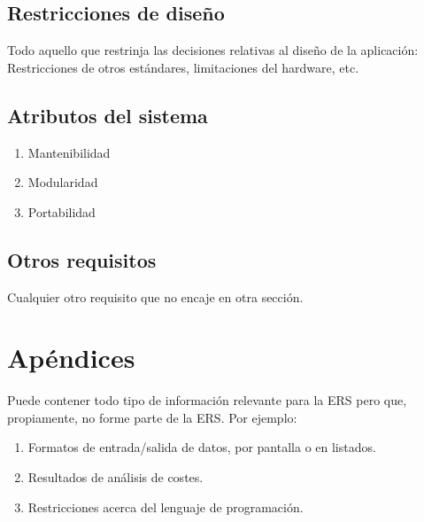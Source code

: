 \documentclass[12pt,a4paper, twosite]{article}
\begin{document}
\subsection{Restricciones de diseño}
\label{sec:org49fe900}


Todo aquello que restrinja las decisiones relativas al diseño de la
aplicación: Restricciones de otros estándares, limitaciones del
hardware, etc.


\subsection{Atributos del sistema}
\label{sec:orgd0babc0}


\begin{enumerate}
  \item Mantenibilidad
  \item Modularidad
  \item Portabilidad
\end{enumerate}



\subsection{Otros requisitos}
\label{sec:org31d2978}

Cualquier otro requisito que no encaje en otra sección.

\newpage


\section{Apéndices}
\label{sec:org75cea03}

Puede contener todo tipo de información relevante para la ERS pero
que, propiamente, no forme parte de la ERS. Por ejemplo:

\begin{enumerate}
\item Formatos de entrada/salida de datos, por pantalla o en listados.

\item Resultados de análisis de costes.

\item Restricciones acerca del lenguaje de programación.
\end{enumerate}
\end{document}
